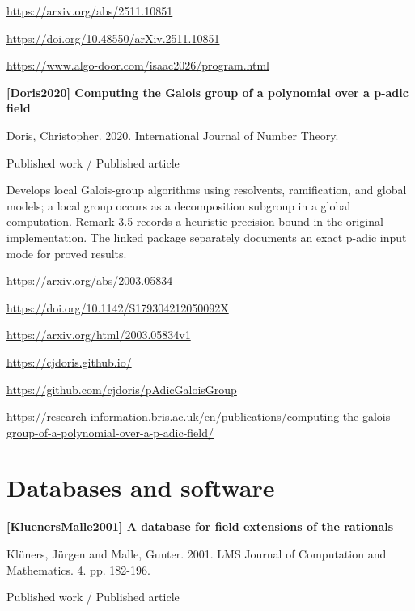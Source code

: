 \documentclass[11pt,a4paper,oneside,openany]{book}
\begin{document}
{\footnotesize\url{https://arxiv.org/abs/2511.10851}}\par
{\footnotesize\url{https://doi.org/10.48550/arXiv.2511.10851}}\par
{\footnotesize\url{https://www.algo-door.com/isaac2026/program.html}}\par
\vspace{9pt}
\hypertarget{ref:Doris2020}{}
{\sffamily\bfseries\color{atlasgreen}[Doris2020] Computing the Galois group of a polynomial over a p-adic field}\par
\color{black} Doris, Christopher. 2020. International Journal of Number Theory.\par
{\small\sffamily\color{atlasgold}Published work / Published article}\par
\color{black} Develops local Galois-group algorithms using resolvents, ramification, and global models; a local group occurs as a decomposition subgroup in a global computation. Remark 3.5 records a heuristic precision bound in the original implementation. The linked package separately documents an exact p-adic input mode for proved results.\par
{\footnotesize\url{https://arxiv.org/abs/2003.05834}}\par
{\footnotesize\url{https://doi.org/10.1142/S179304212050092X}}\par
{\footnotesize\url{https://arxiv.org/html/2003.05834v1}}\par
{\footnotesize\url{https://cjdoris.github.io/}}\par
{\footnotesize\url{https://github.com/cjdoris/pAdicGaloisGroup}}\par
{\footnotesize\url{https://research-information.bris.ac.uk/en/publications/computing-the-galois-group-of-a-polynomial-over-a-p-adic-field/}}\par
\vspace{9pt}
\section{Databases and software}
\hypertarget{ref:KluenersMalle2001}{}
{\sffamily\bfseries\color{atlasgreen}[KluenersMalle2001] A database for field extensions of the rationals}\par
\color{black} Klüners, Jürgen and Malle, Gunter. 2001. LMS Journal of Computation and Mathematics. 4. pp. 182-196.\par
{\small\sffamily\color{atlasgold}Published work / Published article}\par
\end{document}
